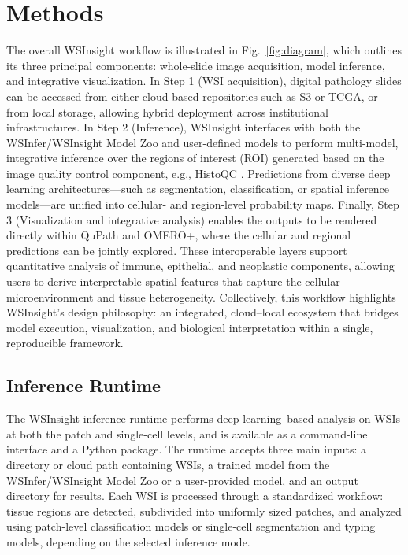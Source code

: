 \documentclass[sn-mathphys-num]{sn-jnl}%
\theoremstyle{thmstyleone}%
\theoremstyle{thmstyletwo}%
\theoremstyle{thmstylethree}%
\begin{document}
	
	\section{Methods}
	\label{sec:methods}
	
	The overall WSInsight workflow is illustrated in Fig.~\ref{fig:diagram}, which outlines its three principal components: whole-slide image acquisition, model inference, and integrative visualization. In Step 1 (WSI acquisition), digital pathology slides can be accessed from either cloud-based repositories such as S3 or TCGA, or from local storage, allowing hybrid deployment across institutional infrastructures. In Step 2 (Inference), WSInsight interfaces with both the WSInfer/WSInsight Model Zoo and user-defined models to perform multi-model, integrative inference over the regions of interest (ROI) generated based on the image quality control component, e.g., HistoQC \cite{Janowczyk:2019}. Predictions from diverse deep learning architectures—such as segmentation, classification, or spatial inference models—are unified into cellular- and region-level probability maps. Finally, Step 3 (Visualization and integrative analysis) enables the outputs to be rendered directly within QuPath and OMERO+, where the cellular and regional predictions can be jointly explored. These interoperable layers support quantitative analysis of immune, epithelial, and neoplastic components, allowing users to derive interpretable spatial features that capture the cellular microenvironment and tissue heterogeneity. Collectively, this workflow highlights WSInsight’s design philosophy: an integrated, cloud–local ecosystem that bridges model execution, visualization, and biological interpretation within a single, reproducible framework.
	
	\subsection{Inference Runtime}
	
	The WSInsight inference runtime performs deep learning–based analysis on WSIs at both the patch and single-cell levels, and is available as a command-line interface and a Python package. The runtime accepts three main inputs: a directory or cloud path containing WSIs, a trained model from the WSInfer/WSInsight Model Zoo or a user-provided model, and an output directory for results. Each WSI is processed through a standardized workflow: tissue regions are detected, subdivided into uniformly sized patches, and analyzed using patch-level classification models or single-cell segmentation and typing models, depending on the selected inference mode.
	
\end{document}

